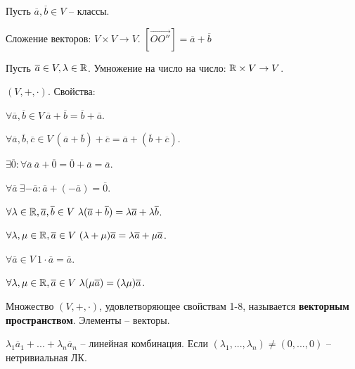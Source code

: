 
	Пусть $\overline{a}, \overline{b} \in V$ -- классы.

	\begin{Def}
		Сложение векторов: $V \times V \to V$.
		$[\overrightarrow{OO''}] = \overline{a} + \overline{b}$ 
	\end{Def}

	\begin{Def}
		Пусть $\overline{a} \in V, \lambda \in \mathbb{R}$. Умножение на число на число: $\mathbb{R} \times V \to V$.
	\end{Def}
	
	$(V, +, \cdot)$. Свойства:
	\begin{MyList}
		\item $\forall \overline{a}, \overline{b} \in V \ \overline{a} + \overline{b} = \overline{b} + \overline{a}$.
		\item $\forall \overline{a}, \overline{b}, \overline{c} \in V \ (\overline{a} + \overline{b}) + \overline{c} = \overline{a} + (\overline{b} + \overline{c})$.
		\item $\exists \overline{0} : \forall \overline{a} \ \overline{a} + \overline{0} = \overline{0} + \overline{a} = \overline{a}$.
		\item $\forall \overline{a} \ \exists -\overline{a} : \overline{a} + (-\overline{a}) = \overline{0}$.
		\item $\forall \lambda \in \mathbb{R}, \overline{a}, \overline{b} \in V \ \lambda(\overline{a} + \overline{b}) = \lambda \overline{a} + \lambda \overline{b}$.
		\item $\forall \lambda, \mu \in \mathbb{R}, \overline{a} \in V \ (\lambda + \mu) \overline{a} = \lambda \overline{a} + \mu \overline{a}$.
		\item $\forall \overline{a} \in V \ 1 \cdot \overline{a} = \overline{a}$.
		\item $\forall \lambda, \mu \in \mathbb{R}, \overline{a} \in V \ \lambda(\mu \overline{a}) = (\lambda \mu) \overline{a}$.
	\end{MyList} 

	\begin{Def}
		Множество $(V, +, \cdot)$, удовлетворяющее свойствам 1-8, называется \textbf{векторным пространством}. Элементы -- векторы.
	\end{Def}


	\begin{Def}
		$\lambda_1 \overline{a}_1 + ... + \lambda_n \overline{a}_n$ -- линейная комбинация. Если $(\lambda_1, ..., \lambda_n) \neq (0, ..., 0)$ -- нетривиальная ЛК.  
	\end{Def}

